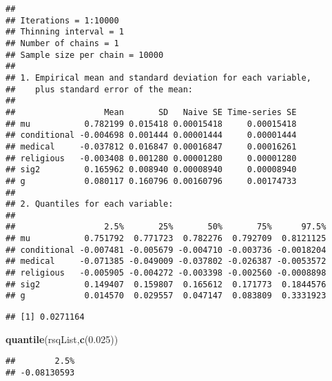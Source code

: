 \documentclass[]{article}
\newenvironment{Shaded}{\begin{snugshade}}{\end{snugshade}}
\newcommand{\DecValTok}[1]{\textcolor[rgb]{0.00,0.00,0.81}{#1}}
\newcommand{\FloatTok}[1]{\textcolor[rgb]{0.00,0.00,0.81}{#1}}
\newcommand{\KeywordTok}[1]{\textcolor[rgb]{0.13,0.29,0.53}{\textbf{#1}}}
\newcommand{\NormalTok}[1]{#1}
\newcommand{\OperatorTok}[1]{\textcolor[rgb]{0.81,0.36,0.00}{\textbf{#1}}}
\newcommand{\StringTok}[1]{\textcolor[rgb]{0.31,0.60,0.02}{#1}}
\begin{document}
\begin{verbatim}
## 
## Iterations = 1:10000
## Thinning interval = 1 
## Number of chains = 1 
## Sample size per chain = 10000 
## 
## 1. Empirical mean and standard deviation for each variable,
##    plus standard error of the mean:
## 
##                  Mean       SD   Naive SE Time-series SE
## mu           0.782199 0.015418 0.00015418     0.00015418
## conditional -0.004698 0.001444 0.00001444     0.00001444
## medical     -0.037812 0.016847 0.00016847     0.00016261
## religious   -0.003408 0.001280 0.00001280     0.00001280
## sig2         0.165962 0.008940 0.00008940     0.00008940
## g            0.080117 0.160796 0.00160796     0.00174733
## 
## 2. Quantiles for each variable:
## 
##                  2.5%       25%       50%       75%      97.5%
## mu           0.751792  0.771723  0.782276  0.792709  0.8121125
## conditional -0.007481 -0.005679 -0.004710 -0.003736 -0.0018204
## medical     -0.071385 -0.049009 -0.037802 -0.026387 -0.0053572
## religious   -0.005905 -0.004272 -0.003398 -0.002560 -0.0008898
## sig2         0.149407  0.159807  0.165612  0.171773  0.1844576
## g            0.014570  0.029557  0.047147  0.083809  0.3331923
\end{verbatim}

\begin{Shaded}
\end{Shaded}

\begin{verbatim}
## [1] 0.0271164
\end{verbatim}

\begin{Shaded}
\begin{Highlighting}[]
\KeywordTok{quantile}\NormalTok{(rsqList,}\KeywordTok{c}\NormalTok{(}\FloatTok{0.025}\NormalTok{))}
\end{Highlighting}
\end{Shaded}

\begin{verbatim}
##        2.5% 
## -0.08130593
\end{verbatim}
\end{document}
